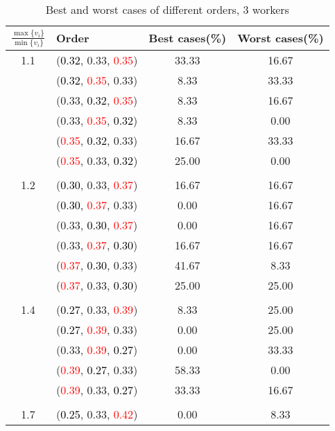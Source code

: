 \documentclass[10pt,a4paper]{report}
\begin{document}
\newpage\begin{center}
	\small
	\begin{longtable}{clcc}
		\caption{Best and worst cases of different orders, 3 workers}\\
		\toprule
		\setlength{\tabcolsep}{1mm}
		\renewcommand\baselinestretch{0.5}\selectfont
		$\frac{\max\{v_i\}}{\min\{v_i\}}$ & Order & Best cases(\%) & Worst cases(\%) \\
			\midrule		1.1			&(\textcolor{black}{0.32}, 0.33, \textcolor{red}{0.35})&33.33&16.67\\
			&(\textcolor{black}{0.32}, \textcolor{red}{0.35}, 0.33)&8.33&33.33\\
			&(0.33, \textcolor{black}{0.32}, \textcolor{red}{0.35})&8.33&16.67\\
			&(0.33, \textcolor{red}{0.35}, \textcolor{black}{0.32})&8.33&0.00\\
			&(\textcolor{red}{0.35}, \textcolor{black}{0.32}, 0.33)&16.67&33.33\\
			&(\textcolor{red}{0.35}, 0.33, \textcolor{black}{0.32})&25.00&0.00\\
		&&&\\
		1.2			&(\textcolor{black}{0.30}, 0.33, \textcolor{red}{0.37})&16.67&16.67\\
			&(\textcolor{black}{0.30}, \textcolor{red}{0.37}, 0.33)&0.00&16.67\\
			&(0.33, \textcolor{black}{0.30}, \textcolor{red}{0.37})&0.00&16.67\\
			&(0.33, \textcolor{red}{0.37}, \textcolor{black}{0.30})&16.67&16.67\\
			&(\textcolor{red}{0.37}, \textcolor{black}{0.30}, 0.33)&41.67&8.33\\
			&(\textcolor{red}{0.37}, 0.33, \textcolor{black}{0.30})&25.00&25.00\\
		&&&\\
		1.4			&(\textcolor{black}{0.27}, 0.33, \textcolor{red}{0.39})&8.33&25.00\\
			&(\textcolor{black}{0.27}, \textcolor{red}{0.39}, 0.33)&0.00&25.00\\
			&(0.33, \textcolor{red}{0.39}, \textcolor{black}{0.27})&0.00&33.33\\
			&(\textcolor{red}{0.39}, \textcolor{black}{0.27}, 0.33)&58.33&0.00\\
			&(\textcolor{red}{0.39}, 0.33, \textcolor{black}{0.27})&33.33&16.67\\
		&&&\\
		1.7			&(\textcolor{black}{0.25}, 0.33, \textcolor{red}{0.42})&0.00&8.33\\

\end{longtable}
\end{center}
\end{document}

